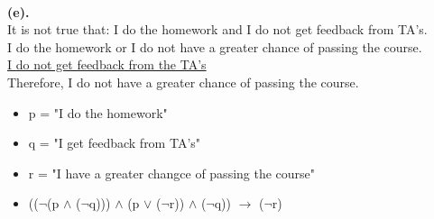 \documentclass[a4paper]{article}
\begin{document}
\ \\
\textbf{(e).}\\
It is not true that: I do the homework and I do not get feedback from TA's.\\
I do the homework or I do not have a greater chance of passing the course.\\
\underline{I do not get feedback from the TA's}\\
Therefore, I do not have a greater chance of passing the course.
\begin{itemize}
    \item p = "I do the homework"
    \item q = "I get feedback from TA's"
    \item r = "I have a greater changce of passing the course"
    \item (($\neg $(p $\wedge $ ($\neg $q))) $\wedge $ (p $\vee $ ($\neg $r)) $\wedge $ ($\neg $q)) $\rightarrow $ ($\neg $r)
\end{itemize}

\newpage
\end{document}
